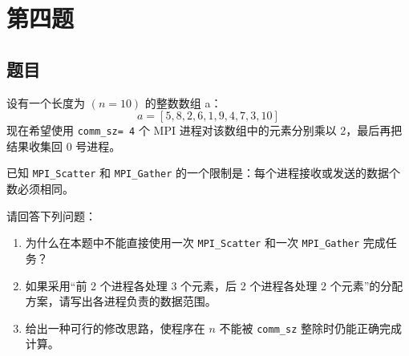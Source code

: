 \chapter{第四题}

\section{题目}

设有一个长度为 $(n=10)$ 的整数数组 a：
$$ a=[5, 8, 2, 6, 1, 9, 4, 7, 3, 10] $$
现在希望使用 \texttt{comm\_sz= 4} 个 MPI 进程对该数组中的元素分别乘以 2，最后再把结果收集回 0 号进程。

已知 \texttt{MPI\_Scatter} 和 \texttt{MPI\_Gather} 的一个限制是：每个进程接收或发送的数据个数必须相同。

请回答下列问题：
\begin{enumerate}
    \item 为什么在本题中不能直接使用一次 \texttt{MPI\_Scatter} 和一次 \texttt{MPI\_Gather} 完成任务？
    \item 如果采用“前 2 个进程各处理 3 个元素，后 2 个进程各处理 2 个元素”的分配方案，请写出各进程负责的数据范围。
    \item 给出一种可行的修改思路，使程序在 $n$ 不能被 \texttt{comm\_sz} 整除时仍能正确完成计算。
\end{enumerate}

